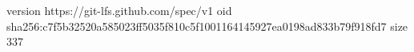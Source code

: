version https://git-lfs.github.com/spec/v1
oid sha256:c7f5b32520a585023ff5035f810c5f1001164145927ea0198ad833b79f918fd7
size 337
